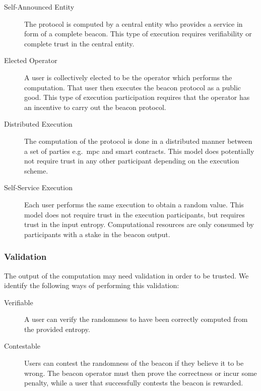 \begin{description}
    \item[Self-Announced Entity] The protocol is computed by a central entity who provides a service in form of a complete beacon. This type of execution requires verifiability or complete trust in the central entity.
    \item[Elected Operator] A user is collectively elected to be the operator which performs the computation. That user then executes the beacon protocol as a public good. This type of execution participation requires that the operator has an incentive to carry out the beacon protocol.
    \item[Distributed Execution] The computation of the protocol is done in a distributed manner between a set of parties e.g.\ \gls{mpc} and smart contracts. This model does potentially not require trust in any other participant depending on the execution scheme.
    \item[Self-Service Execution] Each user performs the same execution to obtain a random value. This model does not require trust in the execution participants, but requires trust in the input entropy. Computational resources are only consumed by participants with a stake in the beacon output.
\end{description}

\subsubsection{Validation}
The output of the computation may need validation in order to be trusted. We identify the following ways of performing this validation:
\begin{description}
    \item [Verifiable] A user can verify the randomness to have been correctly computed from the provided entropy. 
    \item [Contestable] Users can contest the randomness of the beacon if they believe it to be wrong. The beacon operator must then prove the correctness or incur some penalty, while a user that successfully contests the beacon is rewarded. 
\end{description}
